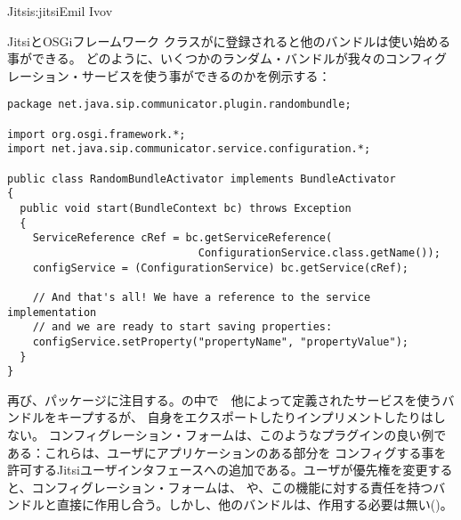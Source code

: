 \begin{aosachapter}{Jitsi}{s:jitsi}{Emil Ivov}
\begin{aosasect1}{JitsiとOSGiフレームワーク}
\noindent {}クラスがに登録されると他のバンドルは使い始める事ができる。
どのように、いくつかのランダム・バンドルが我々のコンフィグレーション・サービスを使う事ができるのかを例示する：

\begin{verbatim}
package net.java.sip.communicator.plugin.randombundle;

import org.osgi.framework.*;
import net.java.sip.communicator.service.configuration.*;

public class RandomBundleActivator implements BundleActivator
{
  public void start(BundleContext bc) throws Exception
  {
    ServiceReference cRef = bc.getServiceReference(
                              ConfigurationService.class.getName());
    configService = (ConfigurationService) bc.getService(cRef);

    // And that's all! We have a reference to the service implementation
    // and we are ready to start saving properties:
    configService.setProperty("propertyName", "propertyValue");
  }
}
\end{verbatim}

\noindent 再び、パッケージに注目する。の中で　他によって定義されたサービスを使うバンドルをキープするが、
自身をエクスポートしたりインプリメントしたりはしない。
コンフィグレーション・フォームは、このようなプラグインの良い例である：これらは、ユーザにアプリケーションのある部分を
コンフィグする事を許可するJitsiユーザインタフェースへの追加である。ユーザが優先権を変更すると、コンフィグレーション・フォームは、
や、この機能に対する責任を持つバンドルと直接に作用し合う。しかし、他のバンドルは、作用する必要は無い()。


\end{aosasect1}
\end{aosachapter}
